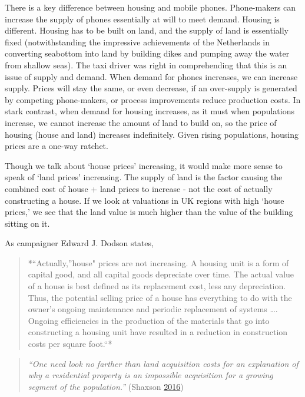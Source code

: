 \documentclass[]{tufte-handout}
\begin{document}
There is a key difference between housing and mobile phones.
Phone-makers can increase the supply of phones essentially at will to
meet demand. Housing is different. Housing has to be built on land, and
the supply of land is essentially fixed (notwithstanding the impressive
achievements of the Netherlands in converting seabottom into land by
building dikes and pumping away the water from shallow seas). The taxi
driver was right in comprehending that this is an issue of supply and
demand. When demand for phones increases, we can increase supply. Prices
will stay the same, or even decrease, if an over-supply is generated by
competing phone-makers, or process improvements reduce production costs.
In stark contrast, when demand for housing increases, as it must when
populations increase, we cannot increase the amount of land to build on,
so the price of housing (house and land) increases indefinitely. Given
rising populations, housing prices are a one-way ratchet.

Though we talk about `house prices' increasing, it would make more sense
to speak of `land prices' increasing. The supply of land is the factor
causing the combined cost of house + land prices to increase - not the
cost of actually constructing a house. If we look at valuations in UK
regions with high `house prices,' we see that the land value is much
higher than the value of the building sitting on it.

As campaigner Edward J. Dodson states,

\begin{quote}
*``Actually,''house" prices are not increasing. A housing unit is a form
of capital good, and all capital goods depreciate over time. The actual
value of a house is best defined as its replacement cost, less any
depreciation. Thus, the potential selling price of a house has
everything to do with the owner's ongoing maintenance and periodic
replacement of systems \ldots{}. Ongoing efficiencies in the production
of the materials that go into constructing a housing unit have resulted
in a reduction in construction costs per square foot.``*
\end{quote}

\begin{quote}
\emph{``One need look no farther than land acquisition costs for an
explanation of why a residential property is an impossible acquisition
for a growing segment of the population.''} (Shaxson
\protect\hyperlink{ref-Shaxson2016}{2016})
\end{quote}
\end{document}
